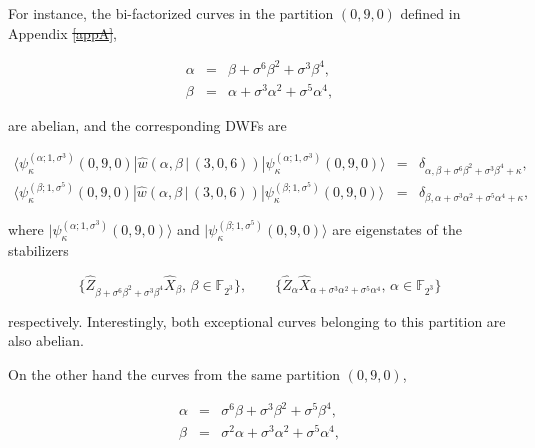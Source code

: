 \documentclass[quantumrep,article,submit,pdftex,moreauthors]{Definitions/mdpi}
\providecommand{\DIFadd}[1]{{\protect\color{blue}\uwave{#1}}} %
\providecommand{\DIFdel}[1]{{\protect\color{red}\sout{#1}}}                      %
\providecommand{\DIFaddbegin}{} %
\providecommand{\DIFaddend}{} %
\providecommand{\DIFdelbegin}{} %
\providecommand{\DIFdelend}{} %
\begin{document}
For instance, the bi-factorized curves in the partition $(0,9,0)$ defined in
Appendix \DIFdelbegin \DIFdel{\ref{appA}}\DIFdelend \DIFaddbegin \DIFadd{\ref{appB}}\DIFaddend ,

\begin{eqnarray}
  \alpha
  &=& \beta + \sigma^{6} \beta^{2} + \sigma^{3}\beta^{4},
  \label{ac1} \\
  \beta
  &=& \alpha + \sigma^{3} \alpha^{2} + \sigma^{5}\alpha^{4},
  \label{ac2}
\end{eqnarray}

are abelian, and the corresponding DWFs are

\begin{eqnarray}
  \langle \psi_{\kappa}^{(\alpha ; 1,\sigma^{3})}(0,9,0)
  |\hat{w}\left(\alpha,\beta \, | \, (3,0,6)\right)
  |\psi_{\kappa}^{(\alpha ; 1,\sigma^{3})}(0,9,0)\rangle
  &=& \delta_{\alpha, \beta + \sigma^{6}\beta^{2} + \sigma^{3} \beta^{4} + \kappa}, \\
  \langle \psi_{\kappa }^{(\beta ; 1,\sigma^{5})}(0,9,0)
  |\hat{w}\left(\alpha,\beta \, | \, (3,0,6)\right)
  |\psi_{\kappa}^{(\beta ; 1,\sigma^{5})}(0,9,0)\rangle
  &=& \delta_{\beta,\alpha + \sigma^{3}\alpha^{2} + \sigma^{5} \alpha^{4} + \kappa},
  \label{ac2 delta}
\end{eqnarray}

where $|\psi_{\kappa}^{(\alpha ; 1,\sigma^{3})}(0,9,0)\rangle$ and
$|\psi_{\kappa }^{(\beta ; 1,\sigma^{5})}(0,9,0)\rangle$ are eigenstates of the
stabilizers

\begin{equation*}
  \{\hat{Z}_{\beta + \sigma^{6}\beta ^{2}+\sigma^{3}\beta^{4}} \hat{X}_{\beta},
  \, \beta \in \mathbb{F}_{2^{3}}\},
  \qquad \{\hat{Z}_{\alpha } \hat{X}_{\alpha + \sigma^{3}\alpha^{2} + \sigma^{5}\alpha^{4}},
  \, \alpha \in \mathbb{F}_{2^{3}}\}
\end{equation*}

respectively. Interestingly, both exceptional curves belonging to this partition
are also abelian.

On the other hand the curves from the same partition $(0,9,0)$,

\begin{eqnarray}
  \alpha
  &=& \sigma^{6}\beta +\sigma^{3}\beta^{2}+\sigma^{5}\beta^{4},
  \label{nac1} \\
  \beta
  &=& \sigma^{2}\alpha +\sigma^{3}\alpha^{2}+\sigma^{5}\alpha^{4},
  \label{nac}
\end{eqnarray}
\DIFdelbegin %
\end{document}
